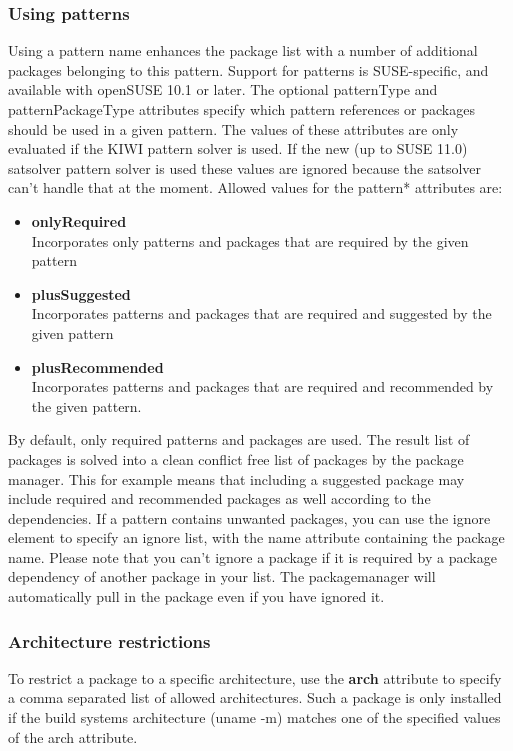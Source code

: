 \subsubsection{Using patterns}
Using a pattern name enhances the package list with a number of
additional packages belonging to this pattern. Support for patterns
is SUSE-specific, and available with openSUSE 10.1 or later.
The optional patternType and patternPackageType attributes specify
which pattern references or packages should be used in a given pattern.
The values of these attributes are only evaluated if the KIWI pattern
solver is used. If the new (up to SUSE 11.0) satsolver pattern solver
is used these values are ignored because the satsolver can't handle
that at the moment. Allowed values for the pattern* attributes are:

\begin{itemize}
\item \textbf{onlyRequired}\\
      Incorporates only patterns and packages that are required by the
      given pattern
\item \textbf{plusSuggested}\\
      Incorporates patterns and packages that are required
      and suggested by the given pattern
\item \textbf{plusRecommended}\\
      Incorporates patterns and packages that are required and
      recommended by the given pattern.
\end{itemize}

By default, only required patterns and packages are used. The result
list of packages is solved into a clean conflict free list of packages
by the package manager. This for example means that including a suggested
package may include required and recommended packages as well according
to the dependencies. If a pattern contains unwanted packages, you can use
the ignore element to specify an ignore list, with the name attribute
containing the package name. Please note that you can't ignore a package
if it is required by a package dependency of another package in your list.
The packagemanager will automatically pull in the package even if you have
ignored it.

\subsubsection{Architecture restrictions}
To restrict a package to a specific architecture, use
the \textbf{arch} attribute to specify a comma separated list of allowed
architectures. Such a package is only installed if the build systems
architecture (uname -m) matches one of the specified values of the arch
attribute.

